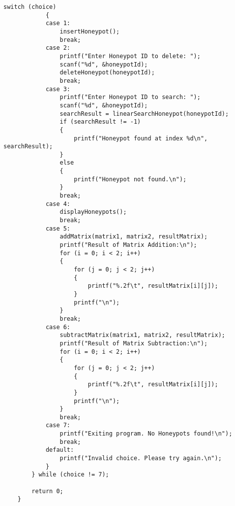 \documentclass{article}
\begin{document}
\begin{lstlisting}[style=CStyle]
            switch (choice)
            {
            case 1:
                insertHoneypot();
                break;
            case 2:
                printf("Enter Honeypot ID to delete: ");
                scanf("%d", &honeypotId);
                deleteHoneypot(honeypotId);
                break;
            case 3:
                printf("Enter Honeypot ID to search: ");
                scanf("%d", &honeypotId);
                searchResult = linearSearchHoneypot(honeypotId);
                if (searchResult != -1)
                {
                    printf("Honeypot found at index %d\n", searchResult);
                }
                else
                {
                    printf("Honeypot not found.\n");
                }
                break;
            case 4:
                displayHoneypots();
                break;
            case 5:
                addMatrix(matrix1, matrix2, resultMatrix);
                printf("Result of Matrix Addition:\n");
                for (i = 0; i < 2; i++)
                {
                    for (j = 0; j < 2; j++)
                    {
                        printf("%.2f\t", resultMatrix[i][j]);
                    }
                    printf("\n");
                }
                break;
            case 6:
                subtractMatrix(matrix1, matrix2, resultMatrix);
                printf("Result of Matrix Subtraction:\n");
                for (i = 0; i < 2; i++)
                {
                    for (j = 0; j < 2; j++)
                    {
                        printf("%.2f\t", resultMatrix[i][j]);
                    }
                    printf("\n");
                }
                break;
            case 7:
                printf("Exiting program. No Honeypots found!\n");
                break;
            default:
                printf("Invalid choice. Please try again.\n");
            }
        } while (choice != 7);
    
        return 0;
    }
    
\end{lstlisting}
\end{document}
